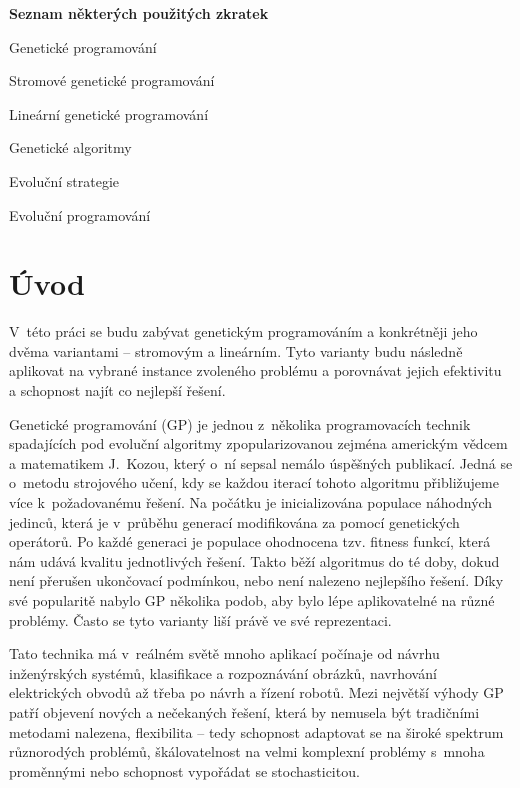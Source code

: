 
\vspace{3cm}
\noindent \textbf{\large Seznam některých použitých zkratek}  \\
\begin{description}[wide=0\parindent]
    \item[GP] Genetické programování 
    \item[TGP] Stromové genetické programování 
    \item[LGP] Lineární genetické programování 
    \item[GA] Genetické algoritmy
    \item[ES] Evoluční strategie 
    \item[EP] Evoluční programování \\
\end{description}

\chapter{Úvod}\label{ch:1}

V~této práci se budu zabývat genetickým programováním a konkrétněji jeho dvěma variantami -- stromovým a lineárním. Tyto varianty budu následně aplikovat na vybrané instance zvoleného problému a porovnávat jejich efektivitu a schopnost najít co nejlepší řešení. 

Genetické programování (GP) je jednou z~několika programovacích technik spadajících pod evoluční algoritmy zpopularizovanou zejména americkým vědcem a matematikem J.~Kozou, který o~ní sepsal nemálo úspěšných publikací. Jedná se o~metodu strojového učení, kdy se každou iterací tohoto algoritmu přibližujeme více k~požadovanému řešení. Na počátku je inicializována populace náhodných jedinců, která je v~průběhu generací modifikována za pomocí genetických operátorů. Po každé generaci je populace ohodnocena tzv. fitness funkcí, která nám udává kvalitu jednotlivých řešení. Takto běží algoritmus do té doby, dokud není přerušen ukončovací podmínkou, nebo není nalezeno nejlepšího řešení. Díky své popularitě nabylo GP několika podob, aby bylo lépe aplikovatelné na různé problémy. Často se tyto varianty liší právě ve své reprezentaci.

Tato technika má v~reálném světě mnoho aplikací počínaje od návrhu inženýrských systémů, klasifikace a rozpoznávání obrázků, navrhování elektrických obvodů až třeba po návrh a řízení robotů. Mezi největší výhody GP patří objevení nových a nečekaných řešení, která by nemusela být tradičními metodami nalezena, flexibilita -- tedy schopnost adaptovat se na široké spektrum různorodých problémů, škálovatelnost na velmi komplexní problémy s~mnoha proměnnými nebo schopnost vypořádat se stochasticitou. 

